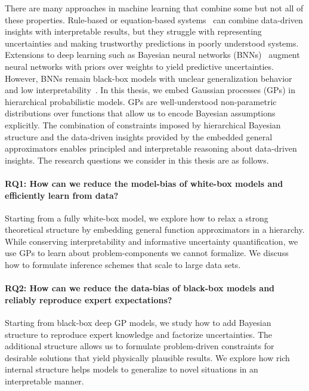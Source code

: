 There are many approaches in machine learning that combine some but not all of these properties.
Rule-based or equation-based systems~\parencite{hein_interpretable_2019,koza_genetic_1992,novak_mathematical_2012} can combine data-driven insights with interpretable results, but they struggle with representing uncertainties and making trustworthy predictions in poorly understood systems.
Extensions to deep learning such as Bayesian neural networks (BNNs)~\parencite{depeweg_modeling_2019,gal_uncertainty_2016} augment neural networks with priors over weights to yield predictive uncertainties.
However, BNNs remain black-box models with unclear generalization behavior and low interpretability~\parencite{rudin_stop_2019}.
In this thesis, we embed Gaussian processes (GPs) in hierarchical probabilistic models.
GPs are well-understood non-parametric distributions over functions that allow us to encode Bayesian assumptions explicitly.
The combination of constraints imposed by hierarchical Bayesian structure and the data-driven insights provided by the embedded general approximators enables principled and interpretable reasoning about data-driven insights.
The research questions we consider in this thesis are as follows.

\paragraph{RQ1: How can we reduce the model-bias of white-box models and efficiently learn from data?}
Starting from a fully white-box model, we explore how to relax a strong theoretical structure by embedding general function approximators in a hierarchy.
While conserving interpretability and informative uncertainty quantification, we use GPs to learn about problem-components we cannot formalize.
We discuss how to formulate inference schemes that scale to large data sets.

\paragraph{RQ2: How can we reduce the data-bias of black-box models and reliably reproduce expert expectations?}
Starting from black-box deep GP models, we study how to add Bayesian structure to reproduce expert knowledge and factorize uncertainties.
The additional structure allows us to formulate problem-driven constraints for desirable solutions that yield physically plausible results.
We explore how rich internal structure helps models to generalize to novel situations in an interpretable manner.

